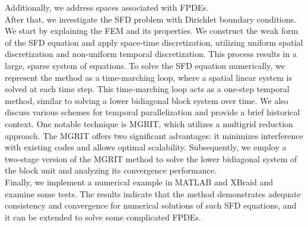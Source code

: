 {Additionally, we address spaces associated with FPDEs. 
\\
After that, we investigate the SFD problem with Dirichlet boundary conditions. 
We start by explaining the FEM and its properties. 
We construct the weak form of the SFD equation and apply space-time discretization, utilizing uniform spatial discretization and non-uniform temporal discretization. 
This process results in a large, sparse system of equations.
To solve the SFD equation numerically, we represent the method as a time-marching loop, where a spatial linear system is solved at each time step. 
This time-marching loop acts as a one-step temporal method, similar to solving a lower bidiagonal block system over time. 
We also discuss various schemes for temporal parallelization and provide a brief historical context.
One notable technique is MGRIT, which utilizes a multigrid reduction approach. 
The MGRIT offers two significant advantages: it minimizes interference with existing codes and allows optimal scalability. 
Subsequently, we employ a two-stage version of the MGRIT method to solve the lower bidiagonal system of the block unit and analyzing its convergence performance. 
\\
Finally, we implement a numerical example in MATLAB and XBraid and examine some tests. 
The results indicate that the method demonstrates adequate consistency and convergence for numerical solutions of such SFD equations, and it can be extended to solve some complicated FPDEs.
}














 
